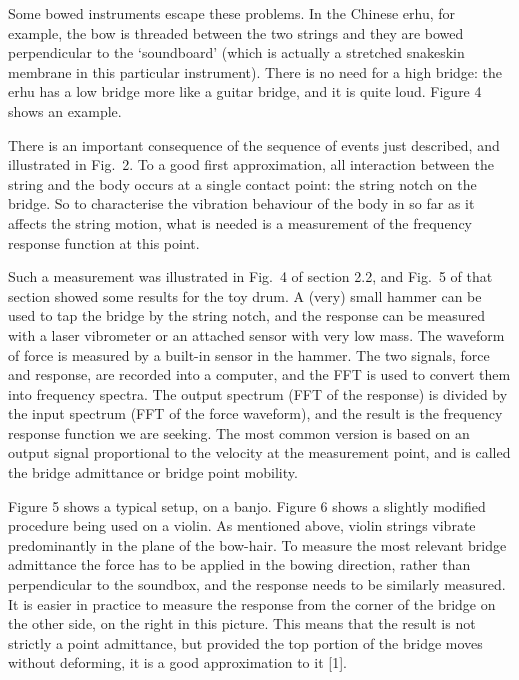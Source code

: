   Some bowed instruments escape these problems. In the Chinese erhu, for 
  example, the bow is threaded between the two strings and they are bowed 
  perpendicular to the ‘soundboard’ (which is actually a stretched snakeskin 
  membrane in this particular instrument). There is no need for a high bridge: 
  the erhu has a low bridge more like a guitar bridge, and it is quite loud. 
  Figure 4 shows an example. 


  There is an important consequence of the sequence of events just described, 
  and illustrated in Fig.\ 2. To a good first approximation, all interaction 
  between the string and the body occurs at a single contact point: the string 
  notch on the bridge. So to characterise the vibration behaviour of the body 
  in so far as it affects the string motion, what is needed is a measurement of 
  the frequency response function at this point. 

  Such a measurement was illustrated in Fig.\ 4 of section 2.2, and Fig.\ 5 of 
  that section showed some results for the toy drum. A (very) small hammer can 
  be used to tap the bridge by the string notch, and the response can be 
  measured with a laser vibrometer or an attached sensor with very low mass. 
  The waveform of force is measured by a built-in sensor in the hammer. The two 
  signals, force and response, are recorded into a computer, and the FFT is 
  used to convert them into frequency spectra. The output spectrum (FFT of the 
  response) is divided by the input spectrum (FFT of the force waveform), and 
  the result is the frequency response function we are seeking. The most common 
  version is based on an output signal proportional to the velocity at the 
  measurement point, and is called the bridge admittance or bridge point 
  mobility. 


  Figure 5 shows a typical setup, on a banjo. Figure 6 shows a slightly 
  modified procedure being used on a violin. As mentioned above, violin strings 
  vibrate predominantly in the plane of the bow-hair. To measure the most 
  relevant bridge admittance the force has to be applied in the bowing 
  direction, rather than perpendicular to the soundbox, and the response needs 
  to be similarly measured. It is easier in practice to measure the response 
  from the corner of the bridge on the other side, on the right in this 
  picture. This means that the result is not strictly a point admittance, but 
  provided the top portion of the bridge moves without deforming, it is a good 
  approximation to it [1]. 

